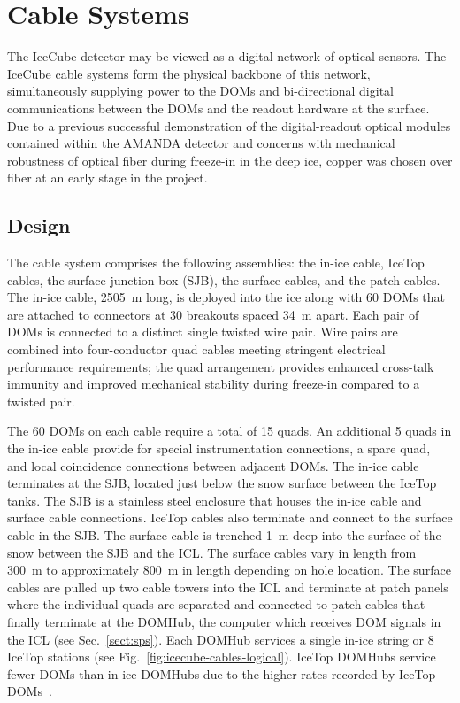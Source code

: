 \section{\label{sec:cable}Cable Systems}

The IceCube detector may be viewed as a digital network of optical
sensors. The IceCube cable systems form the physical backbone of this
network, simultaneously supplying power to the DOMs and bi-directional
digital communications between the DOMs and the readout hardware at the
surface. Due to a previous successful demonstration of the
digital-readout optical modules contained within the AMANDA detector
\cite{AMANDA:string18} and concerns with mechanical robustness of
optical fiber during
freeze-in in the deep ice, copper was chosen over fiber at an early stage in the
project.

\subsection{Design}

The cable system comprises the following assemblies: the in-ice cable,
IceTop cables, the surface junction box (SJB), the surface cables, and the patch
cables. The in-ice cable, 2505~m long, is deployed
into the ice along with 60 DOMs that are attached to connectors at 30
breakouts spaced 34~m apart. Each pair of DOMs is connected to a distinct
single twisted wire pair. Wire pairs are combined into four-conductor quad
cables meeting stringent electrical performance requirements; the quad
arrangement provides enhanced cross-talk immunity and improved
mechanical stability during freeze-in compared to a twisted pair.

The 60 DOMs on each cable require a total of 15 quads. An additional 5 quads in the
in-ice cable provide for special instrumentation connections, a spare quad,
and local coincidence connections between adjacent DOMs. The in-ice
cable terminates at the SJB, located just below the snow surface between
the IceTop tanks. The SJB is a stainless steel
enclosure that houses the in-ice cable and surface cable
connections. IceTop cables also terminate and connect to the surface cable
in the SJB. The surface cable is trenched 1~m deep into the
surface of the snow between the SJB and the ICL. The surface
cables vary in length from 300~m to approximately 800~m in length depending on hole location. The surface cables are
pulled up two cable towers into the ICL and terminate at patch panels where the individual
quads are separated and connected to patch cables that finally
terminate at the DOMHub, the computer which receives DOM signals in the ICL (see Sec.~\ref{sect:sps}). Each
DOMHub services a single in-ice string or 8 IceTop stations (see
Fig.~\ref{fig:icecube-cables-logical}). IceTop DOMHubs service fewer
DOMs than in-ice DOMHubs due to the higher rates recorded by IceTop DOMs~\cite{ICECUBE:IceTop}.


